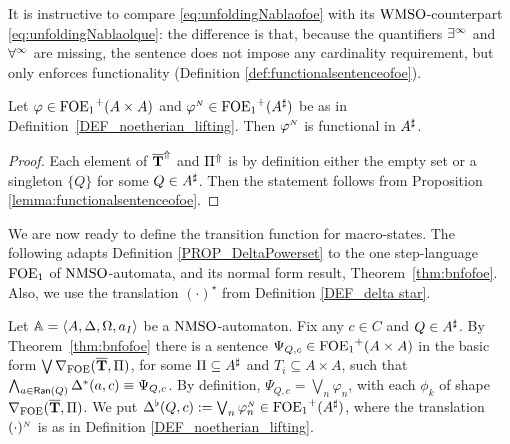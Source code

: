 It is instructive to compare \eqref{eq:unfoldingNablaofoe} with its 
$\mathrm{WMSO}$-counterpart \eqref{eq:unfoldingNablaolque}: the difference is that, 
because the quantifiers $\exists^\infty$ and $\forall^\infty$ are missing, the sentence does not 
impose any cardinality requirement, but only enforces functionality 
(Definition \ref{def:functionalsentenceofoe}).


\begin{lemma}\label{lemma:automatafunctionalsentence}
Let $\varphi \in {\ensuremath{\mathrm{FOE}_1}}^+(A \times A)$ and $\varphi^{{\scriptscriptstyle N}}\in {\ensuremath{\mathrm{FOE}_1}}^+(A^{\sharp} )$ be as in Definition~\ref{DEF_noetherian_lifting}. Then $\varphi^{{\scriptscriptstyle N}}$ is functional in $A^{\sharp}$.
 \end{lemma}
\begin{proof}
Each element of $\overline{{\mathbf{T}}}^{\Uparrow}$ and $\Pi^{\Uparrow}$ is by definition either the empty set or a singleton $\{Q\}$ for some $Q \in A^{\sharp}$. Then the statement follows from Proposition \ref{lemma:functionalsentenceofoe}.\end{proof}

 We are now ready to define the transition function for macro-states. The following adapts Definition \ref{PROP_DeltaPowerset} to the one step-language $\mathrm{FOE}_1$ of $\mathrm{NMSO}$-automata, and its normal form result, Theorem~\ref{thm:bnfofoe}. Also, we use the translation $(\cdot)^{\star}$ from Definition \ref{DEF_delta star}.
\begin{definition}\label{PROP_DeltaPowerset_noet}
Let $\mathbb{A} = \langle{A,\Delta,\Omega,a_I}\rangle$ be a $\mathrm{NMSO}$-automaton. Fix any $c \in C$ and $Q \in A^{\sharp}$. By Theorem~\ref{thm:bnfofoe} there is a sentence $\Psi_{Q,c} \in {\ensuremath{\mathrm{FOE}_1}}^+(A\times A)$ in the basic form $\bigvee \nabla_{\mathrm{FOE}}(\overline{{\mathbf{T}}},\Pi)$, for some $\Pi \subseteq A^{\sharp}$ and $T_i \subseteq A \times A$, such that $\bigwedge_{a \in \mathsf{Ran}(Q)} \Delta^{*}(a,c) \equiv \Psi_{Q,c}$.
By definition, $\Psi_{Q,c} = \bigvee_{n}\varphi_n$, with each $\phi_{k}$ of shape $\nabla_{\mathrm{FOE}}(\overline{{\mathbf{T}}},\Pi)$.
%
We put $\Delta^{\flat}(Q,c) := \bigvee_{n}\varphi_n^{{\scriptscriptstyle N}}  \in {\ensuremath{\mathrm{FOE}_1}}^+(A^{\sharp})$, where the translation $(\cdot)^{{\scriptscriptstyle N}}$ is as in Definition \ref{DEF_noetherian_lifting}.
\end{definition}

